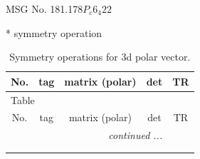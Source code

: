 \documentclass[fleqn,8pt]{jsarticle}
\begin{document}
\setcounter{MaxMatrixCols}{32}

\renewcommand{\tablename}{Table~}
\renewcommand{\figurename}{Figure~}
\begin{center}
\LARGE
MSG No. 181.178\quad$P_{c}6_{4}22$
\end{center}
* symmetry operation
\renewcommand{\arraystretch}{1.3}
\begin{longtable}{ccccc}
\caption{Symmetry operations for 3d polar vector.}
 \\
 \hline \hline
No. & tag & matrix (polar) & det & TR \\ \hline \endfirsthead

\multicolumn{4}{l}{\tablename\ \thetable{}} \\
 \hline \hline
No. & tag & matrix (polar) & det & TR \\ \hline \endhead

 \hline \hline
\multicolumn{4}{r}{\footnotesize\it continued ...} \\ \endfoot

 \hline \hline
\multicolumn{4}{r}{} \\ \endlastfoot


\end{longtable}
\end{document}
